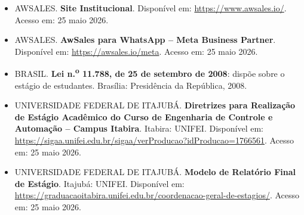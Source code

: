 \documentclass[12pt,a4paper,oneside]{article}
\begin{document}
\begin{itemize}[leftmargin=2em]
  \item AWSALES. \textbf{Site Institucional}. Disponível em: \url{https://www.awsales.io/}. Acesso em: 25 maio 2026.
  \item AWSALES. \textbf{AwSales para WhatsApp -- Meta Business Partner}. Disponível em: \url{https://awsales.io/meta}. Acesso em: 25 maio 2026.
  \item BRASIL. \textbf{Lei n.\textsuperscript{o} 11.788, de 25 de setembro de 2008}: dispõe sobre o estágio de estudantes. Brasília: Presidência da República, 2008.
  \item UNIVERSIDADE FEDERAL DE ITAJUBÁ. \textbf{Diretrizes para Realização de Estágio Acadêmico do Curso de Engenharia de Controle e Automação -- Campus Itabira}. Itabira: UNIFEI. Disponível em: \url{https://sigaa.unifei.edu.br/sigaa/verProducao?idProducao=1766561}. Acesso em: 25 maio 2026.
  \item UNIVERSIDADE FEDERAL DE ITAJUBÁ. \textbf{Modelo de Relatório Final de Estágio}. Itajubá: UNIFEI. Disponível em: \url{https://graduacaoitabira.unifei.edu.br/coordenacao-geral-de-estagios/}. Acesso em: 25 maio 2026.
\end{itemize}
\end{document}
